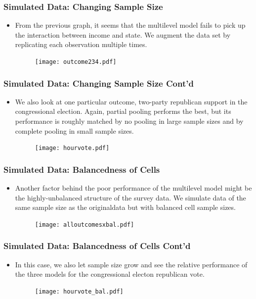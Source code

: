\documentclass[xetex,mathserif,serif]{beamer}
\begin{document}
\begin{frame}
  \frametitle{Simulated Data: Changing Sample Size}
  \begin{itemize}
  \item From the previous graph, it seems that the multilevel model fails to pick
    up the interaction between income and state. We augment the data set by
    replicating each observation multiple times. 
    \begin{figure}[htbp]
      \centering
      \texttt{[image: outcome234.pdf]}
    \end{figure}
  \end{itemize}
\end{frame}

\begin{frame}
  \frametitle{Simulated Data: Changing Sample Size Cont'd}
  \begin{itemize}
  \item We also look at one particular outcome, two-party republican support in
    the congressional election. Again, partial pooling performs the best, but its
    performance is roughly matched by no pooling in large sample sizes and by
    complete pooling in small sample sizes.
    \begin{figure}[htbp]
      \centering
      \texttt{[image: hourvote.pdf]}
    \end{figure}
  \end{itemize}
\end{frame}

\begin{frame}
  \frametitle{Simulated Data: Balancedness of Cells}
  \begin{itemize}
  \item Another factor behind the poor performance of the multilevel model might
    be the highly-unbalanced structure of the survey data. We simulate data of
    the same sample size as the originaldata but with balanced cell sample sizes.
    \begin{figure}[htbp]
      \centering
      \texttt{[image: alloutcomesxbal.pdf]}
    \end{figure}
  \end{itemize}
\end{frame}

\begin{frame}
  \frametitle{Simulated Data: Balancedness of Cells Cont'd}
  \begin{itemize}
  \item In this case, we also let sample size grow and see the relative
    performance of the three models for the congressional electon republican
    vote.
    \begin{figure}[htbp]
      \centering
      \texttt{[image: hourvote\_bal.pdf]}
    \end{figure}
  \end{itemize}
\end{frame}
\end{document}
